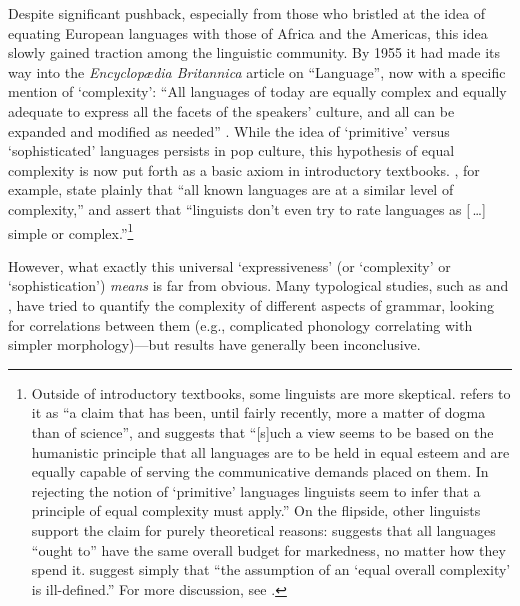 \documentclass[12pt,twoside,leqno]{article} %
\begin{document}
Despite significant pushback, especially from those who bristled at the idea of equating European languages with those of Africa and the Americas, this idea slowly gained traction among the linguistic community. By 1955 it had made its way into the \emph{Encyclopædia Britannica} article on ``Language'', now with a specific mention of `complexity': ``All languages of today are equally complex and equally adequate to express all the facets of the speakers' culture, and all can be expanded and modified as needed'' \citep[698]{trager}. While the idea of `primitive' versus `sophisticated' languages persists in pop culture, this hypothesis of equal complexity is now put forth as a basic axiom in introductory textbooks. \citet[8]{akmajian}, for example, state plainly that ``all known languages are at a similar level of complexity,'' and \citet[8]{ogrady} assert that ``linguists don't even try to rate languages as [\,\ldots] simple or complex.''\footnote{Outside of introductory textbooks, some linguists are more skeptical. \citet[2]{shosted} refers to it as ``a claim that has been, until fairly recently, more a matter of dogma than of science'', and \citet[216]{maddieson} suggests that ``[s]uch a view seems to be based on the humanistic principle that all languages are to be held in equal esteem and are equally capable of serving the communicative demands placed on them. In rejecting the notion of `primitive' languages linguists seem to infer that a principle of equal complexity must apply.'' On the flipside, other linguists support the claim for purely theoretical reasons: \citet[165-166]{chomsky} suggests that all languages ``ought to'' have the same overall budget for markedness, no matter how they spend it. \citet[540]{pellegrino} suggest simply that ``the assumption of an `equal overall complexity' is ill-defined.'' For more discussion, see \citet{joseph}.}


However, what exactly this universal `expressiveness' (or `complexity' or `sophistication') \emph{means} is far from obvious. Many typological studies, such as \citet{maddieson} and \citet{shosted}, have tried to quantify the complexity of different aspects of grammar, looking for correlations between them (e.g., complicated phonology correlating with simpler morphology)---but results have generally been inconclusive.
\end{document}
